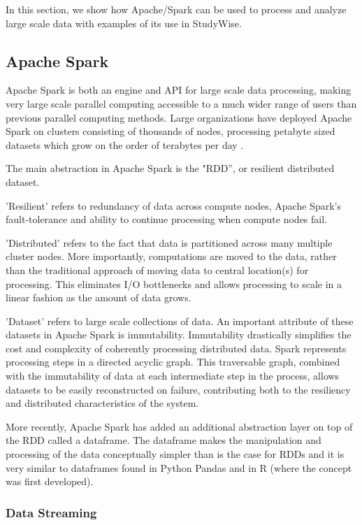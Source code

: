 \documentclass[runningheads,a4paper]{llncs}
\begin{document}
In this section, we show how Apache/Spark can be used to process and analyze large scale data with examples of its use in StudyWise.

\subsection{Apache Spark}

Apache Spark is both an engine and API for large scale data processing, making very large scale parallel computing accessible to a much wider range of users than previous parallel computing methods.  Large organizations have deployed Apache Spark on clusters consisting of thousands of nodes, processing petabyte sized datasets which grow on the order of terabytes per day \cite{Tsai2017}.

The main abstraction in Apache Spark is the "RDD'', or resilient distributed dataset.  

'Resilient' refers to redundancy of data across compute nodes, Apache Spark's fault-tolerance and ability to continue processing when compute nodes fail. 

'Distributed' refers to the fact that data is partitioned across many multiple cluster nodes. More importantly, computations are moved to the data, rather than the traditional approach of moving data to central location(s) for processing. This eliminates I/O bottlenecks and allows processing to scale in a linear fashion as the amount of data grows.

'Dataset' refers to large scale collections of data. An important attribute of these datasets in Apache Spark is immutability. Immutability drastically simplifies the cost and complexity of coherently processing distributed data. Spark represents processing steps in a directed acyclic graph. This traversable graph, combined with the immutability of data at each intermediate step in the process, allows datasets to be easily reconstructed on failure, contributing both to the resiliency and distributed characteristics of the system.

More recently, Apache Spark has added an additional abstraction layer on top of the RDD called a dataframe.  The dataframe makes the manipulation and processing of the data conceptually simpler than is the case for RDDs and it is very similar to dataframes found in Python Pandas and in R (where the concept was first developed).

\subsubsection{Data Streaming}
  
\end{document}
